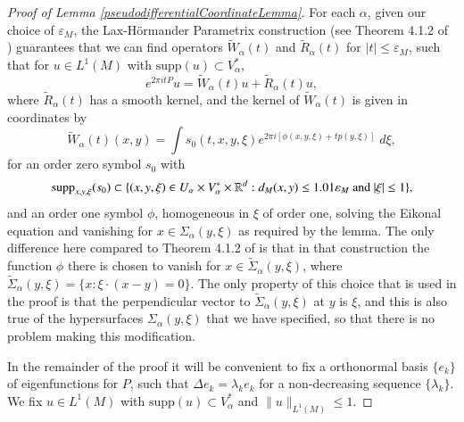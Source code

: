 \begin{proof} [Proof of Lemma \ref{pseudodifferentialCoordinateLemma}]
    For each $\alpha$, given our choice of $\varepsilon_M$, the Lax-H\"{o}rmander Parametrix construction (see Theorem 4.1.2 of \cite{Sogge}) guarantees that we can find operators $\tilde{W}_\alpha(t)$ and $\tilde{R}_\alpha(t)$ for $|t| \leq \varepsilon_M$, such that for $u \in L^1(M)$ with $\text{supp}(u) \subset V_\alpha^*$,
    \begin{equation}
        e^{2 \pi i t P} u = \tilde{W}_\alpha(t) u + \tilde{R}_\alpha(t) u,
    \end{equation}
    where $\tilde{R}_\alpha(t)$ has a smooth kernel, and the kernel of $\tilde{W}_\alpha(t)$ is given in coordinates by
    \begin{equation}
        \tilde{W}_\alpha(t)(x,y) = \int s_0(t,x,y,\xi) e^{2 \pi i [ \phi(x,y,\xi) + t p(y,\xi) ]}\; d\xi,
    \end{equation}
    for an order zero symbol $s_0$ with
    \begin{equation}
        \text{supp}_{x,y,\xi}(s_0) \subset \{ (x,y,\xi) \in U_\alpha \times V_\alpha^* \times \operatorname{\mathbb{R}}^d : d_M(x,y) \leq 1.01\varepsilon_M\ \text{and}\ |\xi| \leq 1 \},
    \end{equation}
    and an order one symbol $\phi$, homogeneous in $\xi$ of order one, solving the Eikonal equation and vanishing for $x \in \Sigma_\alpha(y,\xi)$ as required by the lemma. The only difference here compared to Theorem 4.1.2 of \cite{Sogge} is that in that construction the function $\phi$ there is chosen to vanish for $x \in \tilde{\Sigma}_\alpha(y,\xi)$, where $\tilde{\Sigma}_\alpha(y,\xi) = \{ x : \xi \cdot (x - y) = 0 \}$. The only property of this choice that is used in the proof is that the perpendicular vector to $\tilde{\Sigma}_\alpha(y,\xi)$ at $y$ is $\xi$, and this is also true of the hypersurfaces $\Sigma_\alpha(y,\xi)$ that we have specified, so that there is no problem making this modification.

    In the remainder of the proof it will be convenient to fix a orthonormal basis $\{ e_k \}$ of eigenfunctions for $P$, such that $\Delta e_k = \lambda_k e_k$ for a non-decreasing sequence $\{ \lambda_k \}$. We fix $u \in L^1(M)$ with $\text{supp}(u) \subset V_\alpha^*$ and $\| u \|_{L^1(M)} \leq 1$.


\end{proof}
